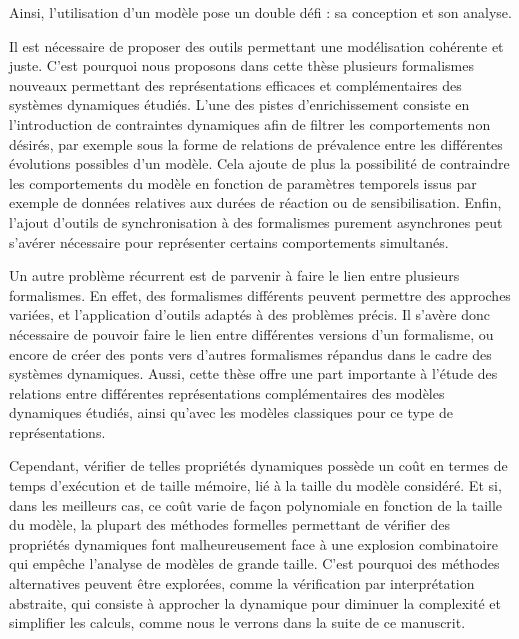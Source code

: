 Ainsi, l'utilisation d'un modèle pose un double défi : sa conception et son analyse.

Il est nécessaire de proposer des outils permettant une modélisation cohérente et juste.
C'est pourquoi nous proposons dans cette thèse plusieurs formalismes nouveaux permettant
des représentations efficaces et complémentaires des systèmes dynamiques étudiés.
L'une des pistes d'enrichissement consiste
en l'introduction de contraintes dynamiques afin de filtrer les comportements non désirés,
par exemple sous la forme 
de relations de prévalence entre les différentes évolutions possibles d'un modèle.
Cela ajoute de plus la possibilité de contraindre les comportements du modèle
en fonction de paramètres temporels issus
par exemple de données relatives aux durées de réaction ou de sensibilisation.
Enfin, l'ajout d'outils de synchronisation à des formalismes purement asynchrones
peut s'avérer nécessaire pour représenter certains comportements simultanés.


Un autre problème récurrent est de parvenir à faire le lien entre plusieurs formalismes.
En effet, des formalismes différents peuvent permettre des approches variées,
et l'application d'outils adaptés à des problèmes précis.
Il s'avère donc nécessaire de pouvoir faire le lien entre différentes versions
d'un formalisme, ou encore de créer des ponts vers d'autres formalismes répandus
dans le cadre des systèmes dynamiques.
Aussi, cette thèse offre une part importante à l'étude des relations entre différentes
représentations complémentaires des modèles dynamiques étudiés,
ainsi qu'avec les modèles classiques pour ce type de représentations.

Cependant, vérifier de telles propriétés dynamiques possède un coût
en termes de temps d'exécution et de taille mémoire,
lié à la taille du modèle considéré.
Et si, dans les meilleurs cas, ce coût varie de façon polynomiale
en fonction de la taille du modèle,
la plupart des méthodes formelles permettant de vérifier des propriétés dynamiques
font malheureusement face à une explosion combinatoire
qui empêche l'analyse de modèles de grande taille.
C'est pourquoi des méthodes alternatives peuvent être explorées,
comme la vérification par interprétation abstraite,
qui consiste à approcher la dynamique pour diminuer la complexité et simplifier les calculs,
comme nous le verrons dans la suite de ce manuscrit.

